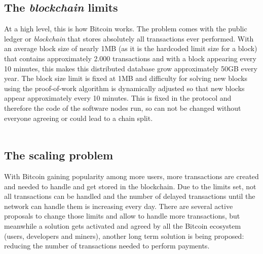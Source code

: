 \documentclass[12pt,journal,compsoc]{IEEEtran}
\begin{document}
\subsection{The \textit{blockchain} limits}
At a high level, this is how Bitcoin works. The problem comes with the public ledger or \textit{blockchain} that stores absolutely all transactions ever performed. With an average block size of nearly 1MB\cite{blockchain-block-size:online} (as it is the hardcoded limit size for a block) that contains approximately 2.000 transactions \cite{blockchain-tx-per-block:online} and with a block appearing every 10 minutes, this makes this distributed database grow approximately 50GB every year\cite{blockchain-size:online}. The block size limit is fixed at 1MB and difficulty for solving new blocks using the proof-of-work algorithm\cite{bitcoin-wiki-proof-of-work:online} is dynamically adjusted so that new blocks appear approximately every 10 minutes. This is fixed in the protocol and therefore the code of the software nodes run, so can not be changed without everyone agreeing or could lead to a chain split\cite{chain-split:online}.\\\\
\subsection{The scaling problem}
With Bitcoin gaining popularity among more users, more transactions are created and needed to handle and get stored in the blockchain. Due to the limits set, not all transactions can be handled and the number of delayed transactions until the network can handle them is increasing every day. There are several active proposals\cite{segwit-org:online,bitcoin-unlimited:online} to change those limits and allow to handle more transactions, but meanwhile a solution gets activated and agreed by all the Bitcoin ecosystem (users, developers and miners), another long term solution is being proposed: reducing the number of transactions needed to perform payments.
\end{document}

